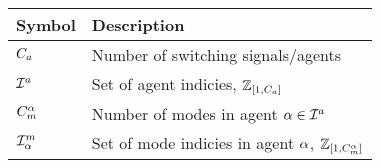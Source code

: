 \begin{center}
\renewcommand{\arraystretch}{1.5}
\begin{table}[t]
\begin{tabular}{|m{1cm}|m{6.8cm}|}
\hline
\textbf{Symbol} & \textbf{Description}\\
\hline\hline
${C_a}$ & Number of switching signals/agents\\
\hline
$\mathcal{I}^a$ & Set of agent indicies, $\mathbb{Z}_{[1,{C_a}]}$\\
\hline
$\nummodes[\agentidx]$ & Number of modes in agent $\alpha\in\mathcal{I}^a$\\
\hline
$\modeidxset[\agentidx]$ & Set of mode indicies in agent $\alpha$, $\int\rii{1}{\nummodes[\agentidx]}$\\
\hline
\end{tabular}
\end{table}
\end{center}